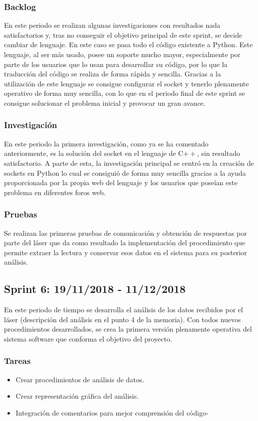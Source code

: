 \subsubsection{Backlog}
En este periodo se realizan algunas investigaciones con resultados nada satisfactorios y, tras no conseguir el objetivo principal de este sprint, se decide cambiar de lenguaje. En este caso se pasa todo el código existente a Python\cite{python}. Este lenguaje, al ser más usado, posee un soporte mucho mayor, especialmente por parte de los usuarios que lo usan para desarrollar su código, por lo que la traducción del código se realiza de forma rápida y sencilla. Gracias a la utilización de este lenguaje se consigue configurar el socket y tenerlo plenamente operativo de forma muy sencilla, con lo que en el periodo final de este sprint se consigue solucionar el problema inicial y provocar un gran avance.
\subsubsection{Investigación}
En este periodo la primera investigación, como ya se ha comentado anteriormente, es la solución del socket en el lenguaje de C$++$, sin resultado satisfactorio. A parte de esta, la investigación principal se centró en la creación de sockets en Python lo cual se consiguió de forma muy sencilla gracias a la ayuda proporcionada por la propia web del lenguaje y los usuarios que poseían este problema en diferentes foros web.
\subsubsection{Pruebas}
Se realizan las primeras pruebas de comunicación y obtención de respuestas por parte del láser que da como resultado la implementación del procedimiento que permite extraer la lectura y conservar esos datos en el sistema para su posterior análisis.

\subsection{Sprint 6: 19/11/2018 - 11/12/2018}
En este periodo de tiempo se desarrolla el análisis de los datos recibidos por el láser (descripción del análisis en el punto 4 de la memoria). Con todos nuevos procedimientos desarrollados, se crea la primera versión plenamente operativa del sistema software que conforma el objetivo del proyecto.
\subsubsection{Tareas}
\begin{itemize}
	\item Crear procedimientos de análisis de datos.
	\item Crear representación gráfica del análisis.
	\item Integración de comentarios para mejor comprensión del código-
\end{itemize}
